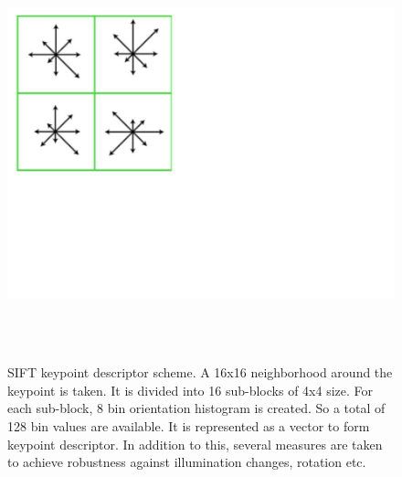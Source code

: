 \begin{figure} \label{s2}
		\centering
		\includegraphics[width=12cm,height=12cm,keepaspectratio]{Figures/sift2}
		\caption[SIFT kp descriptor example]
		{SIFT keypoint descriptor scheme. A 16x16 neighborhood around the keypoint is taken. It is divided into 16 sub-blocks of 4x4 size. For each sub-block, 8 bin orientation histogram is created. So a total of 128 bin values are available. It is represented as a vector to form keypoint descriptor. In addition to this, several measures are taken to achieve robustness against illumination changes, rotation etc.}
\end{figure}

